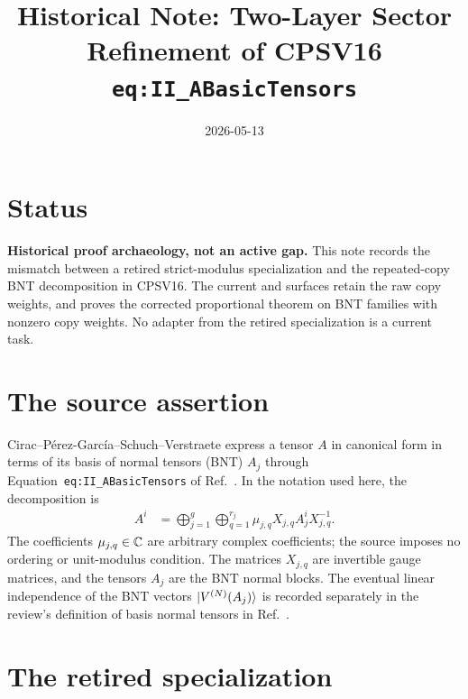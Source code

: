\documentclass{article}
\title{Historical Note: Two-Layer Sector Refinement of CPSV16\\
\texttt{eq:II\_ABasicTensors}}
\author{}
\date{2026-05-13}
\begin{document}
\maketitle
{}

\section{Status}

\textbf{Historical proof archaeology, not an active gap.}
This note records the mismatch between a retired strict-modulus specialization
and the repeated-copy BNT decomposition in CPSV16. The current
 and  surfaces retain the
raw copy weights, and
 proves the
corrected proportional theorem on BNT families with nonzero copy weights. No
adapter from the retired specialization is a current task.

\section{The source assertion}

Cirac--P\'erez-Garc\'ia--Schuch--Verstraete express a tensor $A$ in canonical
form in terms of its basis of normal tensors (BNT) $A_j$ through
Equation~\texttt{eq:II\_ABasicTensors} of
Ref.~\cite{Cirac2016MPDO_arXiv}. In the notation used here, the decomposition
is
\begin{align}
    A^i
        &=\bigoplus_{j=1}^{g}\bigoplus_{q=1}^{r_j}
          \mu_{j,q}X_{j,q}A^i_jX_{j,q}^{-1}.
    \label{eq:two-layer_general_bnt_decomposition}
\end{align}
The coefficients $\mu_{j,q}\in\mathbb{C}$ are arbitrary complex coefficients; the
source imposes no ordering or unit-modulus condition. The matrices $X_{j,q}$
are invertible gauge matrices, and the tensors $A_j$ are the BNT normal blocks.
The eventual linear independence of the BNT vectors
$|V^{(N)}(A_j)\rangle$ is recorded separately in the review's definition of
basis normal tensors in Ref.~\cite{Cirac2021Matrix}.

\section{The retired specialization}
\end{document}
